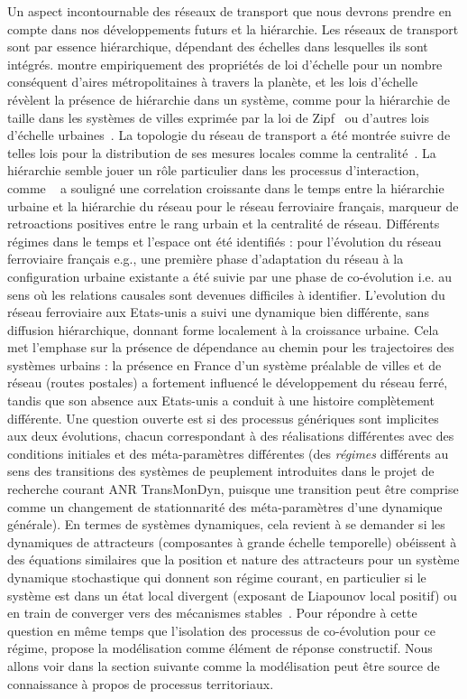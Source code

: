 {}{
Un aspect incontournable des réseaux de transport que nous devrons prendre en compte dans nos développements futurs et la hiérarchie. Les réseaux de transport sont par essence hiérarchique, dépendant des échelles dans lesquelles ils sont intégrés. \cite{10.1371/journal.pone.0102007} montre empiriquement des propriétés de loi d'échelle pour un nombre conséquent d'aires métropolitaines à travers la planète, et les lois d'échelle révèlent la présence de hiérarchie dans un système, comme pour la hiérarchie de taille dans les systèmes de villes exprimée par la loi de Zipf~\cite{nitsch2005zipf} ou d'autres lois d'échelle urbaines~\cite{2013arXiv1301.1674A,2015arXiv151000902B}. La topologie du réseau de transport a été montrée suivre de telles lois pour la distribution de ses mesures locales comme la centralité~\cite{samaniego2008cities}. La hiérarchie semble jouer un rôle particulier dans les processus d'interaction, comme ~\cite{bretagnolle:tel-00459720} a souligné une correlation croissante dans le temps entre la hiérarchie urbaine et la hiérarchie du réseau pour le réseau ferroviaire français, marqueur de retroactions positives entre le rang urbain et la centralité de réseau. Différents régimes dans le temps et l'espace ont été identifiés : pour l'évolution du réseau ferroviaire français e.g., une première phase d'adaptation du réseau à la configuration urbaine existante a été suivie par une phase de co-évolution i.e. au sens où les relations causales sont devenues difficiles à identifier. L'evolution du réseau ferroviaire aux Etats-unis a suivi une dynamique bien différente, sans diffusion hiérarchique, donnant forme localement à la croissance urbaine. Cela met l'emphase sur la présence de dépendance au chemin pour les trajectoires des systèmes urbains : la présence en France d'un système préalable de villes et de réseau (routes postales) a fortement influencé le développement du réseau ferré, tandis que son absence aux Etats-unis a conduit à une histoire complètement différente. Une question ouverte est si des processus génériques sont implicites aux deux évolutions, chacun correspondant à des réalisations différentes avec des conditions initiales et des méta-paramètres différentes (des \emph{régimes} différents au sens des transitions des systèmes de peuplement introduites dans le projet de recherche courant ANR TransMonDyn, puisque une transition peut être comprise comme un changement de stationnarité des méta-paramètres d'une dynamique générale). En termes de systèmes dynamiques, cela revient à se demander si les dynamiques de attracteurs (composantes à grande échelle temporelle) obéissent à des équations similaires que la position et nature des attracteurs pour un système dynamique stochastique qui donnent son régime courant, en particulier si le système est dans un état local divergent (exposant de Liapounov local positif) ou en train de converger vers des mécanismes stables~\cite{sanders1992systeme}. Pour répondre à cette question en même temps que l'isolation des processus de co-évolution pour ce régime, \cite{bretagnolle:tel-00459720} propose la modélisation comme élément de réponse constructif. Nous allons voir dans la section suivante comme la modélisation peut être source de connaissance à propos de processus territoriaux. 
}


